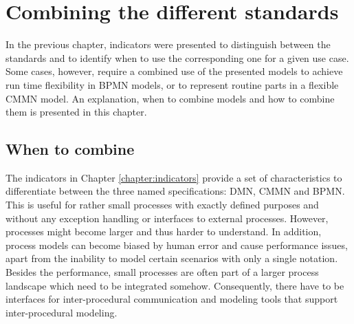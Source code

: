 \chapter{Combining the different standards}
\label{chapter:combination}

In the previous chapter, indicators were presented to distinguish between the standards and to identify when to use the corresponding one for a given use case. Some cases, however, require a combined use of the presented models to achieve run time flexibility in BPMN models, or to represent routine parts in a flexible CMMN model. An explanation, when to combine models and how to combine them is presented in this chapter. 
\section{When to combine}
The indicators in Chapter \ref{chapter:indicators} provide a set of characteristics to differentiate between the three named specifications: DMN, CMMN and BPMN. This is useful for rather small processes with exactly defined purposes and without any exception handling or interfaces to external processes. However, processes might become larger and thus harder to understand. In addition, process models can become biased by human error and cause performance issues, apart from the inability to model certain scenarios with only a single notation. Besides the performance, small processes are often part of a larger process landscape which need to be integrated somehow. Consequently, there have to be  interfaces for inter-procedural communication and modeling tools that support inter-procedural modeling. \\

